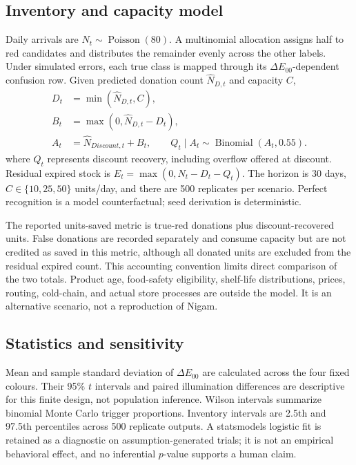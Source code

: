 \documentclass[journal]{IEEEtran}
\newcommand{\dE}{\ensuremath{\Delta E_{00}}}
\begin{document}
\subsection{Inventory and capacity model}
Daily arrivals are $N_t\sim\operatorname{Poisson}(80)$. A multinomial allocation assigns half to red candidates and distributes the remainder evenly across the other labels. Under simulated errors, each true class is mapped through its \dE-dependent confusion row. Given predicted donation count $\widehat N_{D,t}$ and capacity $C$,
\begin{align}
D_t&=\min(\widehat N_{D,t},C),\\
B_t&=\max(0,\widehat N_{D,t}-D_t),\\
A_t&=\widehat N_{Discount,t}+B_t,\qquad
Q_t\mid A_t\sim\operatorname{Binomial}(A_t,0.55).
\end{align}
where $Q_t$ represents discount recovery, including overflow offered at discount. Residual expired stock is $E_t=\max(0,N_t-D_t-Q_t)$. The horizon is 30 days, $C\in\{10,25,50\}$ units/day, and there are 500 replicates per scenario. Perfect recognition is a model counterfactual; seed derivation is deterministic.

The reported units-saved metric is true-red donations plus discount-recovered units. False donations are recorded separately and consume capacity but are not credited as saved in this metric, although all donated units are excluded from the residual expired count. This accounting convention limits direct comparison of the two totals. Product age, food-safety eligibility, shelf-life distributions, prices, routing, cold-chain, and actual store processes are outside the model. It is an alternative scenario, not a reproduction of Nigam.

\subsection{Statistics and sensitivity}
Mean and sample standard deviation of \dE{} are calculated across the four fixed colours. Their 95\% $t$ intervals and paired illumination differences are descriptive for this finite design, not population inference. Wilson intervals summarize binomial Monte Carlo trigger proportions. Inventory intervals are 2.5th and 97.5th percentiles across 500 replicate outputs. A statsmodels logistic fit is retained as a diagnostic on assumption-generated trials; it is not an empirical behavioral effect, and no inferential $p$-value supports a human claim.
\end{document}
